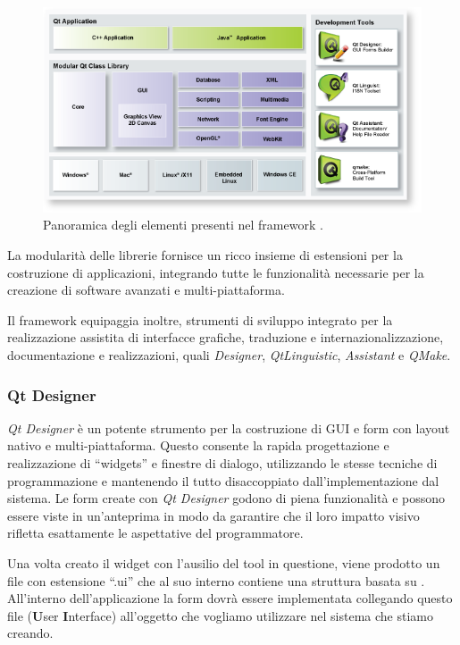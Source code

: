 \begin{figure}[hbt]
	\centering
	\includegraphics[width=12cm]{images/qtframework.png}
	\caption{Panoramica degli elementi presenti nel framework \qt{}.}
	\label{figura:qtframework}
\end{figure}

La modularità delle librerie \qt{} fornisce un ricco insieme di estensioni per la costruzione di applicazioni, integrando tutte le funzionalità necessarie per la creazione di software avanzati e multi-piattaforma.

Il framework equipaggia inoltre, strumenti di sviluppo integrato per la realizzazione assistita di interfacce grafiche, traduzione e internazionalizzazione, documentazione e realizzazioni, quali \emph{Designer}, \emph{QtLinguistic}, \emph{Assistant} e \emph{QMake}.

\subsubsection{Qt Designer}
\emph{Qt Designer} è un potente strumento per la costruzione di GUI e form con layout nativo e multi-piattaforma. Questo consente la rapida progettazione e realizzazione di ``widgets'' e finestre di dialogo, utilizzando le stesse tecniche di programmazione e mantenendo il tutto disaccoppiato dall'implementazione dal sistema. Le form create con \emph{Qt Designer} godono di piena funzionalità e possono essere viste in un'anteprima in modo da garantire che il loro impatto visivo rifletta esattamente le aspettative del programmatore.

Una volta creato il widget con l'ausilio del tool in questione, viene prodotto un file con estensione ``.ui'' che al suo interno contiene una struttura basata su \xml{}. All'interno dell'applicazione la form dovrà essere implementata collegando questo file (\textbf{U}ser \textbf{I}nterface) all'oggetto che vogliamo utilizzare nel sistema che stiamo creando.

